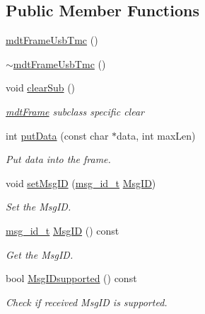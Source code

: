 \subsection*{Public Member Functions}
\begin{DoxyCompactItemize}
\item 
\hyperlink{classmdt_frame_usb_tmc_aae1d433d5bc5dfc4b4508a70b7c0c50b}{mdt\-Frame\-Usb\-Tmc} ()
\item 
\hyperlink{classmdt_frame_usb_tmc_a1d11476d82d6f6fafc7a08153c0335bc}{$\sim$mdt\-Frame\-Usb\-Tmc} ()
\item 
void \hyperlink{classmdt_frame_usb_tmc_afb0b0e071e328b55ce8e2c73359153d6}{clear\-Sub} ()
\begin{DoxyCompactList}\small\item\em \hyperlink{classmdt_frame}{mdt\-Frame} subclass specific clear \end{DoxyCompactList}\item 
int \hyperlink{classmdt_frame_usb_tmc_a06d2743a113bd2b4cf2ee44014ecd710}{put\-Data} (const char $\ast$data, int max\-Len)
\begin{DoxyCompactList}\small\item\em Put data into the frame. \end{DoxyCompactList}\item 
void \hyperlink{classmdt_frame_usb_tmc_a19121b03cbb4c1bb420dc3cdb132f703}{set\-Msg\-I\-D} (\hyperlink{classmdt_frame_usb_tmc_a10c2216157b0616b69f6cabc5c8e253b}{msg\-\_\-id\-\_\-t} \hyperlink{classmdt_frame_usb_tmc_a384a13bd456e6827868a17810d628a4a}{Msg\-I\-D})
\begin{DoxyCompactList}\small\item\em Set the Msg\-I\-D. \end{DoxyCompactList}\item 
\hyperlink{classmdt_frame_usb_tmc_a10c2216157b0616b69f6cabc5c8e253b}{msg\-\_\-id\-\_\-t} \hyperlink{classmdt_frame_usb_tmc_a384a13bd456e6827868a17810d628a4a}{Msg\-I\-D} () const 
\begin{DoxyCompactList}\small\item\em Get the Msg\-I\-D. \end{DoxyCompactList}\item 
bool \hyperlink{classmdt_frame_usb_tmc_a80c01d9585674bed605ef4b8de4df74c}{Msg\-I\-Dsupported} () const 
\begin{DoxyCompactList}\small\item\em Check if received Msg\-I\-D is supported. \end{DoxyCompactList}\item 

\end{DoxyCompactItemize}
